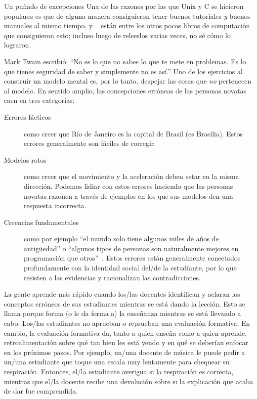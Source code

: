 \begin{aside}{Un puñado de excepciones}
  Una de las razones por las que Unix y C se hicieron populares es que 
  \cite{Kern1978,Kern1983,Kern1988}
  de alguna manera consiguieron tener buenos tutoriales \emph{y} buenos manuales al mismo tiempo.
  \cite{Fehi2008} y ~\cite{Ray2014} están entre los otros pocos libros de computación que consiguieron esto; incluso luego de releerlos varias veces, no sé cómo lo lograron.
\end{aside}


Mark Twain escribió: 
``No es lo que no sabes lo que te mete en problemas.
Es lo que tienes seguridad de saber y simplemente no es así.''
Uno de los ejercicios al construir un modelo mental es, por lo tanto,
despejar las cosas que \emph{no} pertenecen al modelo.
En sentido amplio,
las concepciones erróneas de las personas novatas caen en tres categorías:

\begin{description}

\item[Errores fácticos]
  como creer que Río de Janeiro es la capital de Brasil (es Brasilia).
Estos errores generalmente son fáciles de corregir.

\item[Modelos rotos]
  como creer que el movimiento y la aceleración deben estar en la misma dirección.
Podemos lidiar con estos errores haciendo que las personas novatas razonen a través de ejemplos
en los que sus modelos den una respuesta incorrecta.

\item[Creencias fundamentales]
  como por ejemplo ``el mundo solo tiene algunos miles de años de antigüedad''
  o ``algunos tipos de personas son naturalmente mejores en programación que otros''~\cite{Guzd2015b,Pati2016}.
  Estos errores están generalmente conectados profundamente con la identidad social del/de la estudiante, 
por lo que resisten a las evidencias y racionalizan las contradicciones.

\end{description}

La gente aprende más rápido cuando los/las docentes identifican y aclaran los conceptos erróneos de sus estudiantes mientras se está dando la lección.
Esto se llama 
porque forma (o le da forma a) la enseñanza mientras se está llevando a cabo.
Los/las estudiantes no aprueban o reprueban una evaluación formativa.
En cambio,
la evaluación formativa da, tanto a quien enseña como a quien aprende, retroalimentación sobre qué tan bien les está yendo y en qué se deberían enfocar en los próximos pasos.
Por ejemplo,
un/una docente de música le puede pedir a un/una estudiante que toque una escala muy lentamente para chequear su respiración.
Entonces, el/la estudiante averigua si la respiración es correcta, mientras que el/la docente recibe una devolución sobre si la explicación que acaba de dar fue comprendida.

